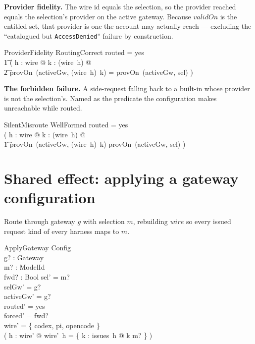 \documentclass{article}
\begin{document}
\textbf{Provider fidelity.} The wire id equals the selection, so the provider
reached equals the selection's provider on the active gateway. Because $validOn$
is the entitled set, that provider is one the account may actually reach ---
excluding the ``catalogued but \texttt{AccessDenied}'' failure by construction.

\begin{schema}{ProviderFidelity}
  RoutingCorrect
\where
  routed = yes \implies \\
  \t1 ( \forall h : \dom wire @ \forall k : \dom (wire~h) @ \\
  \t2   provOn~(activeGw, (wire~h)~k) = provOn~(activeGw, sel) )
\end{schema}

\textbf{The forbidden failure.} A side-request falling back to a built-in whose
provider is not the selection's. Named as the predicate the configuration makes
unreachable while routed.

\begin{schema}{SilentMisroute}
  WellFormed
\where
  routed = yes \\
  ( \exists h : \dom wire @ \exists k : \dom (wire~h) @ \\
  \t1 provOn~(activeGw, (wire~h)~k) \neq provOn~(activeGw, sel) )
\end{schema}

\section{Shared effect: applying a gateway configuration}

Route through gateway $g$ with selection $m$, rebuilding $wire$ so every issued
request kind of every harness maps to $m$.

\begin{schema}{ApplyGateway}
  \Delta Config \\
  g? : Gateway \\
  m? : ModelId \\
  fwd? : Bool
\where
  sel' = m? \\
  selGw' = g? \\
  activeGw' = g? \\
  routed' = yes \\
  forced' = fwd? \\
  \dom wire' = \{ codex, pi, opencode \} \\
  ( \forall h : \dom wire' @ wire'~h = \{ k : issues~h @ k \mapsto m? \} )
\end{schema}
\end{document}
